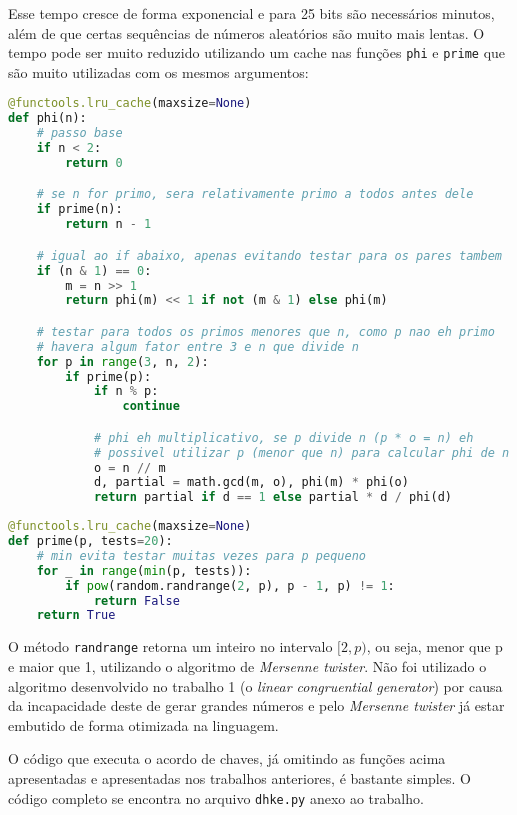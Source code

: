 \documentclass[12pt]{article}
\begin{document}
Esse tempo cresce de forma exponencial e para 25 bits são necessários minutos,
além de que certas sequências de números aleatórios são muito mais lentas. O
tempo pode ser muito reduzido utilizando um cache nas funções \texttt{phi} e
\texttt{prime} que são muito utilizadas com os mesmos argumentos:

\begin{lstlisting}[language=Python]
@functools.lru_cache(maxsize=None)
def phi(n):
    # passo base
    if n < 2:
        return 0

    # se n for primo, sera relativamente primo a todos antes dele
    if prime(n):
        return n - 1

    # igual ao if abaixo, apenas evitando testar para os pares tambem
    if (n & 1) == 0:
        m = n >> 1
        return phi(m) << 1 if not (m & 1) else phi(m)

    # testar para todos os primos menores que n, como p nao eh primo
    # havera algum fator entre 3 e n que divide n
    for p in range(3, n, 2):
        if prime(p):
            if n % p:
                continue

            # phi eh multiplicativo, se p divide n (p * o = n) eh
            # possivel utilizar p (menor que n) para calcular phi de n
            o = n // m
            d, partial = math.gcd(m, o), phi(m) * phi(o)
            return partial if d == 1 else partial * d / phi(d)
\end{lstlisting}

\begin{lstlisting}[language=Python]
@functools.lru_cache(maxsize=None)
def prime(p, tests=20):
    # min evita testar muitas vezes para p pequeno
    for _ in range(min(p, tests)):
        if pow(random.randrange(2, p), p - 1, p) != 1:
            return False
    return True
\end{lstlisting}

O método \texttt{randrange} retorna um inteiro no intervalo $[2, p)$, ou seja,
menor que p e maior que 1, utilizando o algoritmo de \textit{Mersenne twister}.
Não foi utilizado o algoritmo desenvolvido no trabalho 1 (o
\textit{linear congruential generator}) por causa da incapacidade deste de
gerar grandes números e pelo \textit{Mersenne twister} já estar embutido de
forma otimizada na linguagem.

O código que executa o acordo de chaves, já omitindo as funções acima
apresentadas e apresentadas nos trabalhos anteriores, é bastante simples. O
código completo se encontra no arquivo \texttt{dhke.py} anexo ao trabalho.
\end{document}
